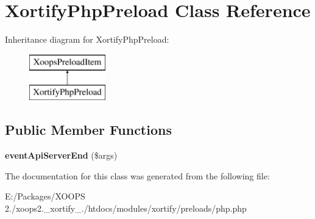 \hypertarget{class_xortify_php_preload}{\section{Xortify\-Php\-Preload Class Reference}
\label{class_xortify_php_preload}
}
Inheritance diagram for Xortify\-Php\-Preload\-:\begin{figure}[H]
\begin{center}
\leavevmode
\includegraphics[height=2.000000cm]{class_xortify_php_preload}
\end{center}
\end{figure}
\subsection*{Public Member Functions}
\begin{DoxyCompactItemize}
\item 
\hypertarget{class_xortify_php_preload_a78cd63c1cbc39c648b74f201a16b018c}{{\bfseries event\-Api\-Server\-End} (\$args)}\label{class_xortify_php_preload_a78cd63c1cbc39c648b74f201a16b018c}

\end{DoxyCompactItemize}


The documentation for this class was generated from the following file\-:\begin{DoxyCompactItemize}
\item 
E\-:/\-Packages/\-X\-O\-O\-P\-S 2./xoops2.\-\_\-xortify\-\_./htdocs/modules/xortify/preloads/php.\-php\end{DoxyCompactItemize}
